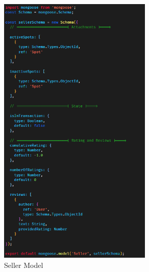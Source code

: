         \begin{figure}[h]
            \centering
            \includegraphics[width=0.65\textwidth]{images/sellerModel.png}
            \caption{Seller Model}
            \label{fig:sellerModel}
        \end{figure}

